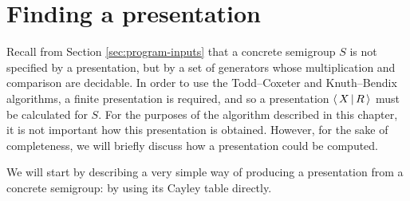 \section{Finding a presentation}
\label{sec:find-pres}

Recall from Section \ref{sec:program-inputs} that a concrete semigroup $S$ is
not specified by a presentation, but by a set of generators whose multiplication
and comparison are decidable.  In order to use the Todd--Coxeter and
Knuth--Bendix algorithms, a finite presentation is required, and so a presentation
$\left\langle\,X\,\middle|\,R\,\right\rangle$ must be calculated for $S$.  For the purposes of the algorithm
described in this chapter, it is not important how this presentation is
obtained.  However, for the sake of completeness, we will briefly discuss how a
presentation could be computed.

We will start by describing a very simple way of producing a presentation from a
concrete semigroup: by using its Cayley table directly.

